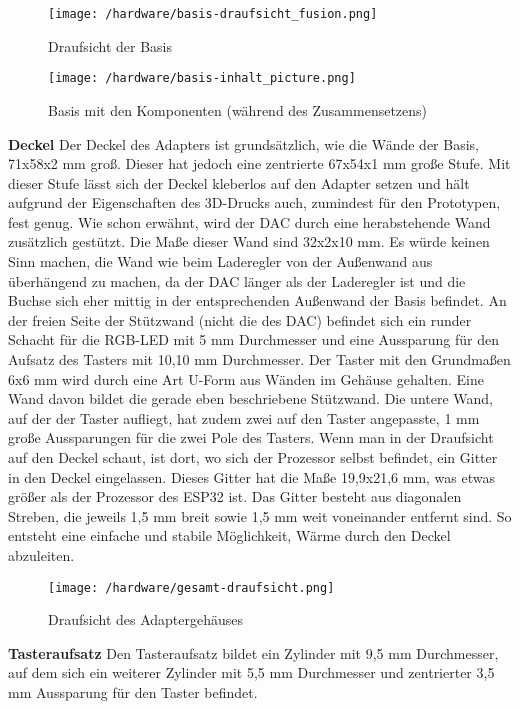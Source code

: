 \documentclass[11pt, twoside]{article}
\begin{document}
\begin{figure}[H]
	\texttt{[image: /hardware/basis-draufsicht\_fusion.png]}
	\caption{Draufsicht der Basis}
\end{figure}
\begin{figure}[H]
	\texttt{[image: /hardware/basis-inhalt\_picture.png]}
	\caption{Basis mit den Komponenten (während des Zusammensetzens)}
\end{figure}
\noindent \textbf{Deckel} \newline
Der Deckel des Adapters ist grundsätzlich, wie die Wände der Basis, 71x58x2 mm groß. Dieser hat jedoch eine zentrierte 67x54x1 mm große Stufe. Mit dieser Stufe lässt sich der Deckel kleberlos auf den Adapter setzen und hält aufgrund der Eigenschaften des 3D-Drucks auch, zumindest für den Prototypen, fest genug.
Wie schon erwähnt, wird der DAC durch eine herabstehende Wand zusätzlich gestützt. Die Maße dieser Wand sind 32x2x10 mm. Es würde keinen Sinn machen, die Wand wie beim Laderegler von der Außenwand aus überhängend zu machen, da der DAC länger als der Laderegler ist und die Buchse sich eher mittig in der entsprechenden Außenwand der Basis befindet.\newline
An der freien Seite der Stützwand (nicht die des DAC) befindet sich ein runder Schacht für die RGB-LED mit 5 mm Durchmesser und eine Aussparung für den Aufsatz des Tasters mit 10,10 mm Durchmesser. Der Taster mit den Grundmaßen 6x6 mm wird durch eine Art U-Form aus Wänden im Gehäuse gehalten. Eine Wand davon bildet die gerade eben beschriebene Stützwand. Die untere Wand, auf der der Taster aufliegt, hat zudem zwei auf den Taster angepasste, 1 mm große Aussparungen für die zwei Pole des Tasters.\newline
Wenn man in der Draufsicht auf den Deckel schaut, ist dort, wo sich der Prozessor selbst befindet, ein Gitter in den Deckel eingelassen. Dieses Gitter hat die Maße 19,9x21,6 mm, was etwas größer als der Prozessor des ESP32 ist. Das Gitter besteht aus diagonalen Streben, die jeweils 1,5 mm breit sowie 1,5 mm weit voneinander entfernt sind. So entsteht eine einfache und stabile Möglichkeit, Wärme durch den Deckel abzuleiten.\newline
\begin{figure}[H]
	\texttt{[image: /hardware/gesamt-draufsicht.png]}
	\caption{Draufsicht des Adaptergehäuses}
\end{figure}
\noindent \textbf{Tasteraufsatz} \newline
Den Tasteraufsatz bildet ein Zylinder mit 9,5 mm Durchmesser, auf dem sich ein weiterer Zylinder mit 5,5 mm Durchmesser und zentrierter 3,5 mm Aussparung für den Taster befindet.\newline
\parencite[vgl.][]{noauthor_urlnl12_nodate}\newline
\parencite[vgl.][]{noauthor_urlnl17_nodate}
\end{document}
